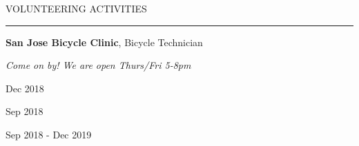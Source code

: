 \documentclass[letterpaper,10pt,oneside]{article}
\begin{document}
\begin{body}
{
\hspace{-1.72in}\noindent\color{cblue}
{VOLUNTEERING ACTIVITIES} %
}

\vspace{-1.6ex}
{\hspace{-1.73in}\noindent\color{dblue}\rule{6.935in}{0.4pt}} %
\vspace{-2ex}

{\hspace{-1.73in}\small
\textbf{San Jose Bicycle Clinic}, Bicycle Technician }

{\hspace{-1.73in}\textsl{Come on by! We are open Thurs/Fri 5-8pm}}

\begin{subtitle}
\vspace{-30ex}
{{Dec 2018}}

\vspace{4ex}
{{Sep 2018}}

\vspace{12ex}
{{Sep 2018 - Dec 2019}}

\end{subtitle}




\end{body}

\end{document}
